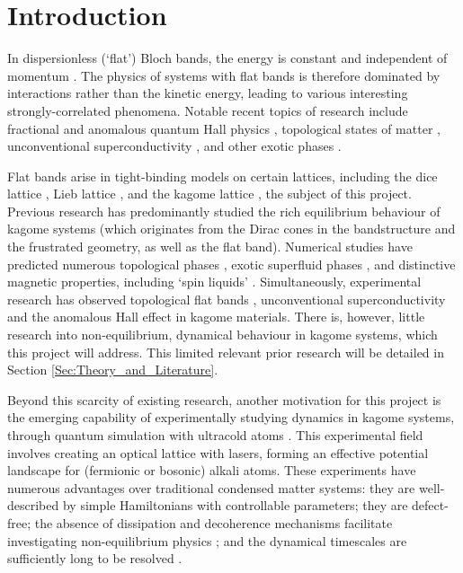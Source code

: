 
\chapter{Introduction}\label{Introduction}

In dispersionless (`flat') Bloch bands, the energy is constant and independent of momentum \cite{Leykam}. The physics of systems with flat bands is therefore dominated by interactions rather than the kinetic energy, leading to various interesting strongly-correlated phenomena. Notable recent topics of research include fractional and anomalous quantum Hall physics \cite{Neupert,Tang,Parameswaran,Leonard,Kida,Liu}, topological states of matter \cite{Rachel,Sun,Bergman,Yin,Li,Kang}, unconventional superconductivity \cite{Kopnin,Sato,Xu,Yankowitz,Mielke,Guguchia}, and other exotic phases \cite{Isakov06,You,Katsura}.

Flat bands arise in tight-binding models on certain lattices, including the dice lattice \cite{Sutherland}, Lieb lattice \cite{Lieb}, and the kagome lattice \cite{Syozi}, the subject of this project. Previous research has predominantly studied the rich equilibrium behaviour of kagome systems (which originates from the Dirac cones in the bandstructure and the frustrated geometry, as well as the flat band). Numerical studies have predicted numerous topological phases \cite{Bergman,Isakov07,Guo,Roychowdhury}, exotic superfluid phases \cite{Isakov06,Huber,You,Julku21,Julku21-2}, and distinctive magnetic properties, including `spin liquids' \cite{Huse,Balents,Plat,Broholm}. Simultaneously, experimental research has observed topological flat bands \cite{Kang,Li}, unconventional superconductivity \cite{Yin,Mielke,Guguchia} and the anomalous Hall effect \cite{Kida,Liu} in kagome materials. There is, however, little research into non-equilibrium, dynamical behaviour in kagome systems, which this project will address. This limited relevant prior research will be detailed in Section \ref{Sec:Theory_and_Literature}.

Beyond this scarcity of existing research, another motivation for this project is the emerging capability of experimentally studying dynamics in kagome systems, through quantum simulation with ultracold atoms \cite{Bloch,Gross}. This experimental field involves creating an optical lattice with lasers, forming an effective potential landscape for (fermionic or bosonic) alkali atoms. These experiments have numerous advantages over traditional condensed matter systems: they are well-described by simple Hamiltonians with controllable parameters; they are defect-free; the absence of dissipation and decoherence mechanisms facilitate investigating non-equilibrium physics \cite{Langen}; and the dynamical timescales are sufficiently long to be resolved \cite{Polkovnikov}.

